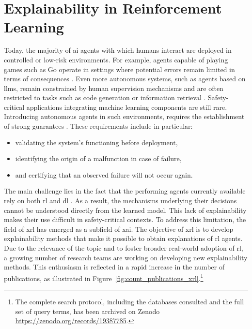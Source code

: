 \chapter{Explainability in Reinforcement Learning}
\label{chap:explainability_reinforcement_learning}

\glsresetall

Today, the majority of \gls{ai} agents with which humans interact are deployed in controlled or low-risk environments.
For example, agents capable of playing games such as Go operate in settings where potential errors remain limited in terms of consequences \parencite{silver2017mastering}.
Even more autonomous systems, such as agents based on \glspl{llm}, remain constrained by human supervision mechanisms and are often restricted to tasks such as code generation or information retrieval \parencite{chen2021evaluating, lewis2021retrievalaugmentedgenerationknowledgeintensivenlp}.
Safety-critical applications integrating machine learning components are still rare.
Introducing autonomous agents in such environments, requires the establishment of strong guarantees \parencite{seshia2022toward}.
These requirements include in particular:
\begin{itemize}
    \item validating the system's functioning before deployment,
    \item identifying the origin of a malfunction in case of failure,
    \item and certifying that an observed failure will not occur again.
\end{itemize}

The main challenge lies in the fact that the performing agents currently available rely on both \gls{rl} and \gls{dl} \parencite{mnih2013playingatarideepreinforcement}.
As a result, the mechanisms underlying their decisions cannot be understood directly from the learned model.
This lack of explainability makes their use difficult in safety-critical contexts.
To address this limitation, the field of \gls{xrl} has emerged as a subfield of \gls{xai}.
The objective of \gls{xrl} is to develop explainability methods that make it possible to obtain explanations of \gls{rl} agents.
Due to the relevance of the topic and to foster broader real-world adoption of \gls{rl}, a growing number of research teams are working on developing new explainability methods.
This enthusiasm is reflected in a rapid increase in the number of publications, as illustrated in Figure~\ref{fig:count_publications_xrl}.\footnote{The complete search protocol, including the databases consulted and the full set of query terms, has been archived on Zenodo \url{https://zenodo.org/records/19387785}.}

